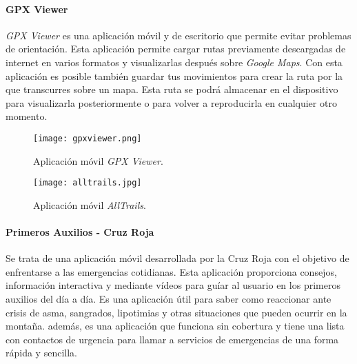\paragraph{GPX Viewer}

\textit{GPX Viewer} es una aplicación móvil y de escritorio que permite evitar problemas de orientación. Esta aplicación permite cargar rutas previamente descargadas de internet en varios formatos y visualizarlas después sobre \textit{Google Maps}. Con esta aplicación es posible también guardar tus movimientos para crear la ruta por la que transcurres sobre un mapa. Esta ruta se podrá almacenar en el dispositivo para visualizarla posteriormente o para volver a reproducirla en cualquier otro momento. 


\begin{figure}[!htb]
   \begin{minipage}{0.48\textwidth}
     \centering
     \texttt{[image: gpxviewer.png]}
	\caption{Aplicación móvil \textit{GPX Viewer}. \protect\footnotemark}
	\label{fig:gpxviewer}
   \end{minipage}\hfill
   \begin{minipage}{0.48\textwidth}
     \centering
     \texttt{[image: alltrails.jpg]}
	 \caption{Aplicación móvil \textit{AllTrails}. \protect\footnotemark}
	 \label{fig:alltrails}
   \end{minipage}
\end{figure}


\paragraph{Primeros Auxilios - Cruz Roja}

Se trata de una aplicación móvil desarrollada por la Cruz Roja con el objetivo de enfrentarse a las emergencias cotidianas. Esta aplicación proporciona consejos, información interactiva y mediante vídeos para guíar al usuario en los primeros auxilios del día a día. Es una aplicación útil para saber como reaccionar ante crisis de asma, sangrados, lipotimias y otras situaciones que pueden ocurrir en la montaña. además, es una aplicación que funciona sin cobertura y tiene una lista con contactos de urgencia para llamar a servicios de emergencias de una forma rápida y sencilla.

